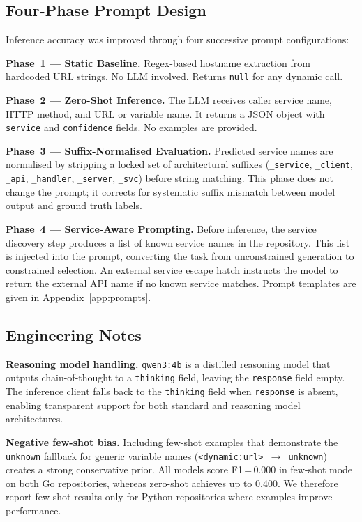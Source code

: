 \documentclass[runningheads]{llncs}
\begin{document}
\subsection{Four-Phase Prompt Design}
\label{sec:phases}

Inference accuracy was improved through four successive prompt
configurations:

\textbf{Phase~1 --- Static Baseline.} Regex-based hostname extraction from
hardcoded URL strings. No LLM involved. Returns \texttt{null} for any
dynamic call.

\textbf{Phase~2 --- Zero-Shot Inference.} The LLM receives caller service
name, HTTP method, and URL or variable name. It returns a JSON object with
\texttt{service} and \texttt{confidence} fields. No examples are provided.

\textbf{Phase~3 --- Suffix-Normalised Evaluation.} Predicted service names
are normalised by stripping a locked set of architectural suffixes
(\texttt{\_service}, \texttt{\_client}, \texttt{\_api}, \texttt{\_handler},
\texttt{\_server}, \texttt{\_svc}) before string matching. This phase does
not change the prompt; it corrects for systematic suffix mismatch between
model output and ground truth labels.

\textbf{Phase~4 --- Service-Aware Prompting.} Before inference, the service
discovery step produces a list of known service names in the repository.
This list is injected into the prompt, converting the task from
unconstrained generation to constrained selection. An external service
escape hatch instructs the model to return the external API name if no
known service matches. Prompt templates are given in Appendix~\ref{app:prompts}.

\subsection{Engineering Notes}

\textbf{Reasoning model handling.} \texttt{qwen3:4b} is a distilled
reasoning model that outputs chain-of-thought to a \texttt{thinking} field,
leaving the \texttt{response} field empty. The inference client falls back
to the \texttt{thinking} field when \texttt{response} is absent, enabling
transparent support for both standard and reasoning model architectures.

\textbf{Negative few-shot bias.} Including few-shot examples that
demonstrate the \texttt{unknown} fallback for generic variable names
(\texttt{<dynamic:url> $\to$ unknown}) creates a strong conservative prior.
All models score F1\,=\,0.000 in few-shot mode on both Go repositories,
whereas zero-shot achieves up to 0.400. We therefore report few-shot
results only for Python repositories where examples improve performance.
\end{document}
